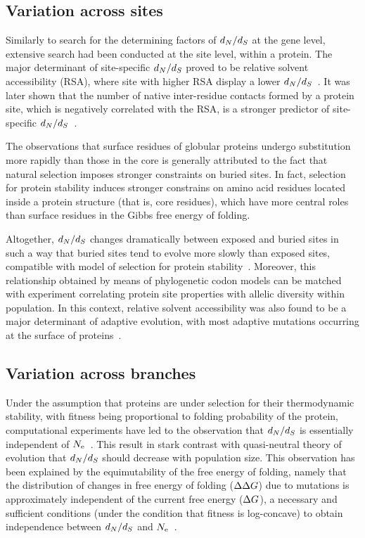 \subsection{Variation across sites}

Similarly to search for the determining factors of $d_N / d_S$ at the gene level, extensive search had been conducted at the site level, within a protein.
The major determinant of site-specific $d_N / d_S$ proved to be relative solvent accessibility (RSA), where site with higher RSA display a lower $d_N / d_S$~\citep{Ramsey2011}.
It was later shown that the number of native inter-residue contacts formed by a protein site, which is negatively correlated with the RSA, is a stronger predictor of site-specific $d_N / d_S$~\citep{Yeh2013}.

The observations that surface residues of globular proteins undergo \gls{substitution} more rapidly than those in the core is generally attributed to the fact that natural selection imposes stronger constraints on buried sites.
In fact, selection for protein stability induces stronger constrains on amino acid residues located inside a protein structure (that is, core residues), which have more central roles than surface residues in the Gibbs free energy of folding.

Altogether, $d_N / d_S$ changes dramatically between exposed and buried sites in such a way that buried sites tend to evolve more slowly than exposed sites, compatible with model of selection for protein stability~\citep{Echave2016}.
Moreover, this relationship obtained by means of phylogenetic \gls{codon} models can be matched with experiment correlating protein site properties with allelic diversity within population.
In this context, relative solvent accessibility was also found to be a major determinant of adaptive evolution, with most adaptive mutations occurring at the surface of proteins~\citep{Moutinho2019}.

\subsection{Variation across branches}

Under the assumption that proteins are under selection for their thermodynamic stability, with fitness being proportional to folding probability of the protein, computational experiments have led to the observation that $d_N / d_S$ is essentially independent of $N_{\textrm{e}}$~\citep{Goldstein2013}.
This result in stark contrast with quasi-neutral theory of evolution that $d_N / d_S$ should decrease with population size.
This observation has been explained by the equimutability of the free energy of folding, namely that the distribution of changes in free energy of folding ($\Delta \Delta G$) due to mutations is approximately independent of the current free energy ($\Delta G$), a necessary and sufficient conditions (under the condition that fitness is log-concave) to obtain independence between $d_N / d_S$ and $N_{\textrm{e}}$~\citep{Cherry1998}.

